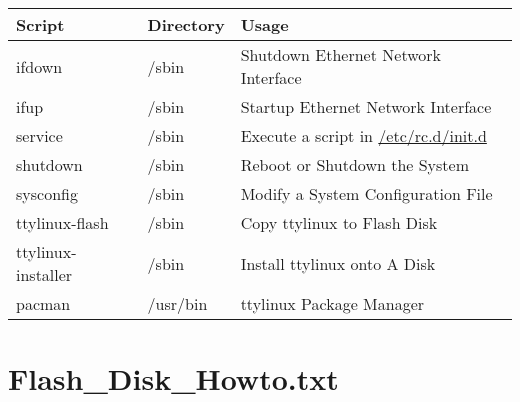 \documentclass[10pt]{article}
\begin{document}
\begin{center}
\begin{tabular}{l|l|l}
Script & Directory & Usage \\
\hline
ifdown             & /sbin    & Shutdown Ethernet Network Interface        \\
ifup               & /sbin    & Startup Ethernet Network Interface         \\
service            & /sbin    & Execute a script in \url{/etc/rc.d/init.d} \\
shutdown           & /sbin    & Reboot or Shutdown the System              \\
sysconfig          & /sbin    & Modify a System Configuration File         \\
ttylinux-flash     & /sbin    & Copy ttylinux to Flash Disk                \\
ttylinux-installer & /sbin    & Install ttylinux onto A Disk               \\
pacman             & /usr/bin & ttylinux Package Manager                   \\
\end{tabular}
\end{center}

\newpage
\section{Flash\_Disk\_Howto.txt}
\label{flashdiskhowto}
\end{document}
